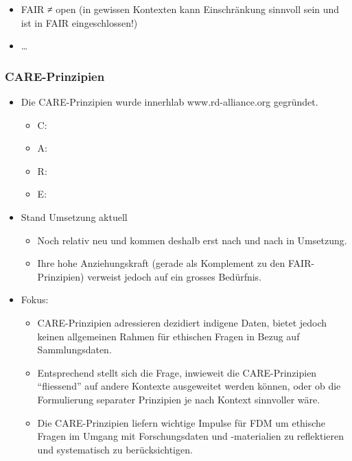 \documentclass[
  letterpaper,
  DIV=11,
  numbers=noendperiod]{scrartcl}
\providecommand{\tightlist}{%
  \setlength{\itemsep}{0pt}\setlength{\parskip}{0pt}}\usepackage{longtable,booktabs,array}
\begin{document}
\begin{itemize}
\tightlist
\item
  FAIR ≠ open (in gewissen Kontexten kann Einschränkung sinnvoll sein
  und ist in FAIR eingeschlossen!)
\item
  \ldots{}
\end{itemize}

\subsubsection{CARE-Prinzipien}\label{care-prinzipien}

\begin{itemize}
\tightlist
\item
  Die CARE-Prinzipien wurde innerhlab www.rd-alliance.org gegründet.

  \begin{itemize}
  \tightlist
  \item
    C:
  \item
    A:
  \item
    R:
  \item
    E:
  \end{itemize}
\item
  Stand Umsetzung aktuell

  \begin{itemize}
  \tightlist
  \item
    Noch relativ neu und kommen deshalb erst nach und nach in Umsetzung.
  \item
    Ihre hohe Anziehungskraft (gerade als Komplement zu den
    FAIR-Prinzipien) verweist jedoch auf ein grosses Bedürfnis.
  \end{itemize}
\item
  Fokus:

  \begin{itemize}
  \tightlist
  \item
    CARE-Prinzipien adressieren dezidiert indigene Daten, bietet jedoch
    keinen allgemeinen Rahmen für ethischen Fragen in Bezug auf
    Sammlungsdaten.
  \item
    Entsprechend stellt sich die Frage, inwieweit die CARE-Prinzipien
    ``fliessend'' auf andere Kontexte ausgeweitet werden können, oder ob
    die Formulierung separater Prinzipien je nach Kontext sinnvoller
    wäre.
  \item
    Die CARE-Prinzipien liefern wichtige Impulse für FDM um ethische
    Fragen im Umgang mit Forschungsdaten und -materialien zu
    reflektieren und systematisch zu berücksichtigen.
  \end{itemize}


\end{itemize}
\end{document}

